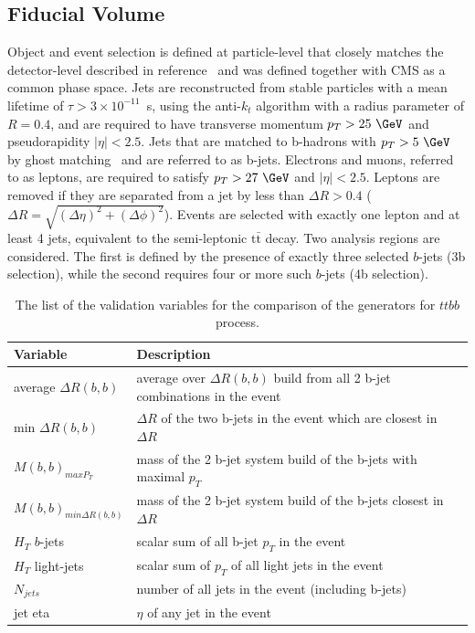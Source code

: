 \subsection{Fiducial Volume}
Object and event selection is defined at particle-level that closely matches the detector-level described in reference~\cite{HIGG-2017-03} and was defined together with CMS as a common phase space. Jets are reconstructed from stable particles with a mean lifetime of $\tau > 3\times 10^{-11}$~s, using the anti-$k_t$ algorithm with a radius parameter of $R=0.4$, and are required to have transverse momentum $p_{T}>25~\GeV$ and pseudorapidity $|\eta|< 2.5$. Jets that are matched to b-hadrons with $p_{T}>5~\GeV$ by ghost matching~\cite{Cacciari:2008gn} and are referred to as b-jets. Electrons and muons, referred to as leptons, are required to satisfy $p_{T}>27~\GeV$ and $|\eta|< 2.5$. 
Leptons are removed if they are separated from a jet by less than $\Delta R>0.4$ ($\Delta R = \sqrt{(\Delta \eta )^2 + (\Delta \phi)^2}$).
Events are selected with exactly one lepton and at least 4 jets, equivalent to the semi-leptonic $\mathrm{t\bar{t}}$ decay.
Two analysis regions are considered. The first is defined by the presence of exactly three selected $b$-jets (3b selection), while the second requires four or more such $b$-jets (4b selection).


\begin{table}[]
\begin{center}
\caption{\label{tab:ttbb_varlist}
The list of the validation variables for the comparison of the generators for $ttbb$ process.}
\vspace{0.25cm}
{\small
\setlength\tabcolsep{1.5pt}
\begin{tabular}{l|l}
\hline\hline
Variable & Description  \\ \hline
average $\Delta R (b,b)$&    average over $\Delta R(b, b)$ build from all 2 b-jet combinations in the event           \\ 
min $\Delta R (b,b)$ &    $\Delta R$ of the two b-jets in the event which are closest in $\Delta R $          \\ 
$M (b,b)_{maxP_T}$ &      mass of the 2 b-jet system build of the b-jets with maximal $p_T$         \\ 
$M (b,b)_{min\Delta R(b,b)}$ &         mass of the 2 b-jet system build of the b-jets closest in $\Delta R $     \\ 
$H_T$  $b$-jets&           scalar sum of all b-jet $p_T$ in the event    \\ 
$H_T$ light-jets&        scalar sum of $p_T$ of all light jets in the event       \\ 
$N_{jets}$   &     number of all jets in the event (including b-jets)          \\ 
jet eta &          $\eta$ of any jet in the event     \\ 
    \hline\hline    
\end{tabular}
}
\end{center}
\end{table}





